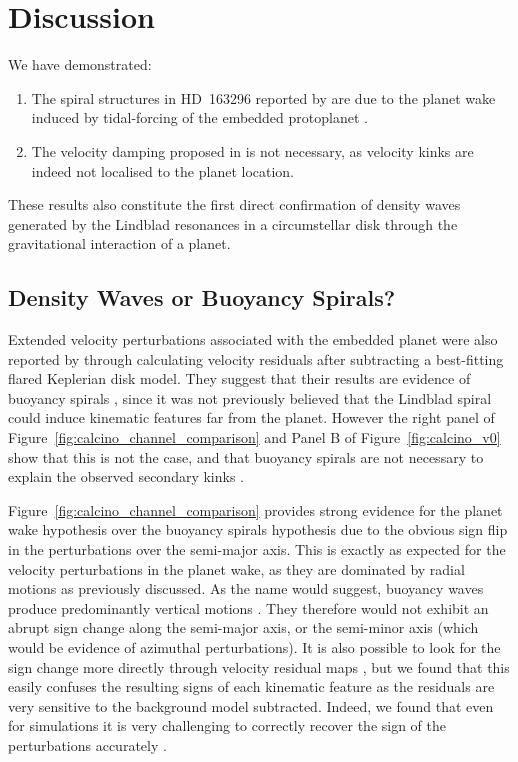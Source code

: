 \section{Discussion}

We have demonstrated:
\begin{enumerate}
    \item The spiral structures in HD~163296 reported by \citet{teague2021} are due to the planet wake induced by tidal-forcing of the embedded protoplanet \citep{pinte2018a}.
    \item The velocity damping proposed in  is not necessary, as velocity kinks are indeed not localised to the planet location.
\end{enumerate}

These results also constitute the first direct confirmation of density waves generated by the Lindblad resonances in a circumstellar disk through the gravitational interaction of a planet.

\subsection{Density Waves or Buoyancy Spirals?}

Extended velocity perturbations associated with the embedded planet were also reported by \citet{teague2021} through calculating velocity residuals after subtracting a best-fitting flared Keplerian disk model.
They suggest that their results are evidence of buoyancy spirals \citep{zhu2012,bae2021}, since it was not previously believed that the Lindblad spiral could induce kinematic features far from the planet.
However the right panel of Figure~\ref{fig:calcino_channel_comparison} and Panel B of Figure~\ref{fig:calcino_v0} show that this is not the case, and that buoyancy spirals are not necessary to explain the observed secondary kinks .

Figure~\ref{fig:calcino_channel_comparison} provides strong evidence for the planet wake hypothesis over the buoyancy spirals hypothesis due to the obvious sign flip in the perturbations over the semi-major axis.
This is exactly as expected for the velocity perturbations in the planet wake, as they are dominated by radial motions as previously discussed.
As the name would suggest, buoyancy waves produce predominantly vertical motions \citep{bae2021}.
They therefore would not exhibit an abrupt sign change along the semi-major axis, or the semi-minor axis (which would be evidence of azimuthal perturbations).
It is also possible to look for the sign change more directly through velocity residual maps \citep{teague2021,izquierdo2021}, but we found that this easily confuses the resulting signs of each kinematic feature as the residuals are very sensitive to the background model subtracted.
Indeed, we found that even for simulations it is very challenging to correctly recover the sign of the perturbations accurately \citep[see Appendix~A of][for further detail]{calcino2022}.


